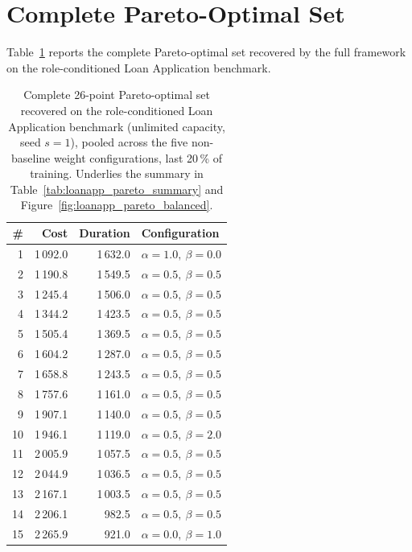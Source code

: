 \section{Complete Pareto-Optimal Set}
\label{app:loanapp_pareto_points}

Table~\ref{tab:app_loanapp_pareto_points} reports the complete
Pareto-optimal set recovered by the full framework on the
role-conditioned Loan Application benchmark.

\begin{table}[H]
\centering
\renewcommand{\arraystretch}{1.5}
\setlength{\tabcolsep}{14pt}
\caption{Complete 26-point Pareto-optimal set recovered on the
role-conditioned Loan Application benchmark (unlimited capacity, seed
$s=1$), pooled across the five non-baseline weight configurations,
last 20\,\% of training. Underlies the summary in
Table~\ref{tab:loanapp_pareto_summary} and
Figure~\ref{fig:loanapp_pareto_balanced}.}
\label{tab:app_loanapp_pareto_points}
\begin{tabular}{rrrl}
\toprule
\textbf{\#} & \textbf{Cost} & \textbf{Duration} & \textbf{Configuration} \\
\midrule
1  & 1\,092.0 & 1\,632.0 & $\alpha=1.0,\ \beta=0.0$ \\
2  & 1\,190.8 & 1\,549.5 & $\alpha=0.5,\ \beta=0.5$ \\
3  & 1\,245.4 & 1\,506.0 & $\alpha=0.5,\ \beta=0.5$ \\
4  & 1\,344.2 & 1\,423.5 & $\alpha=0.5,\ \beta=0.5$ \\
5  & 1\,505.4 & 1\,369.5 & $\alpha=0.5,\ \beta=0.5$ \\
6  & 1\,604.2 & 1\,287.0 & $\alpha=0.5,\ \beta=0.5$ \\
7  & 1\,658.8 & 1\,243.5 & $\alpha=0.5,\ \beta=0.5$ \\
8  & 1\,757.6 & 1\,161.0 & $\alpha=0.5,\ \beta=0.5$ \\
9  & 1\,907.1 & 1\,140.0 & $\alpha=0.5,\ \beta=0.5$ \\
10 & 1\,946.1 & 1\,119.0 & $\alpha=0.5,\ \beta=2.0$ \\
11 & 2\,005.9 & 1\,057.5 & $\alpha=0.5,\ \beta=0.5$ \\
12 & 2\,044.9 & 1\,036.5 & $\alpha=0.5,\ \beta=0.5$ \\
13 & 2\,167.1 & 1\,003.5 & $\alpha=0.5,\ \beta=0.5$ \\
14 & 2\,206.1 &   982.5  & $\alpha=0.5,\ \beta=0.5$ \\
15 & 2\,265.9 &   921.0  & $\alpha=0.0,\ \beta=1.0$ \\

\end{tabular}
\end{table}
